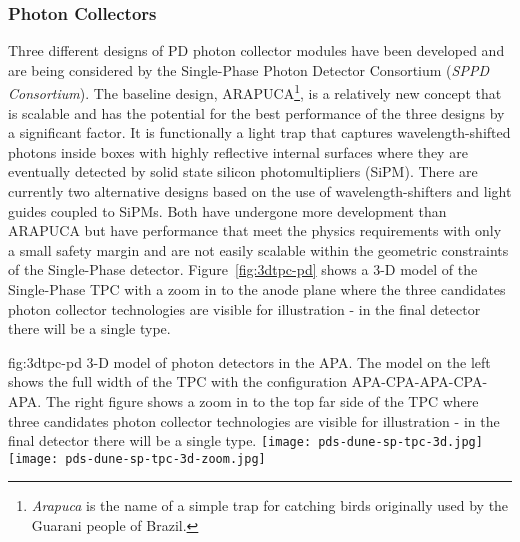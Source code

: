 
\subsubsection{Photon Collectors} 
Three different designs of PD photon collector modules have been developed and are being considered by the Single-Phase Photon Detector Consortium ({\it SPPD Consortium}). The baseline design, ARAPUCA\footnote{{\it Arapuca} is the name of a simple trap for catching birds originally used by the Guarani people of Brazil.}, is a relatively new concept that is scalable and has the potential for the best performance of the three designs by a significant factor. It is functionally a light trap that captures wavelength-shifted photons inside boxes with highly reflective internal surfaces where they are eventually detected by solid state silicon photomultipliers (SiPM).  There are currently two alternative designs based on the use of wavelength-shifters and light guides coupled to SiPMs. Both have undergone more development than ARAPUCA but have performance that meet the physics requirements with only a small safety margin and are not easily scalable within the geometric constraints of the Single-Phase detector.
Figure~\ref{fig:3dtpc-pd} shows a 3-D model of the Single-Phase TPC with a zoom in to the anode plane where the three candidates photon collector technologies are visible for illustration - in the final detector there will be a single type.

\begin{dunefigure}{fig:3dtpc-pd}
{3-D model of photon detectors in the APA. The model on the left shows the full width of the TPC with the configuration APA-CPA-APA-CPA-APA. The right figure shows a zoom in to the top far side of the TPC where three candidates photon collector technologies are visible for illustration - in the final detector there will be a single type.}
\texttt{[image: pds-dune-sp-tpc-3d.jpg]}
\texttt{[image: pds-dune-sp-tpc-3d-zoom.jpg]}
\end{dunefigure}

